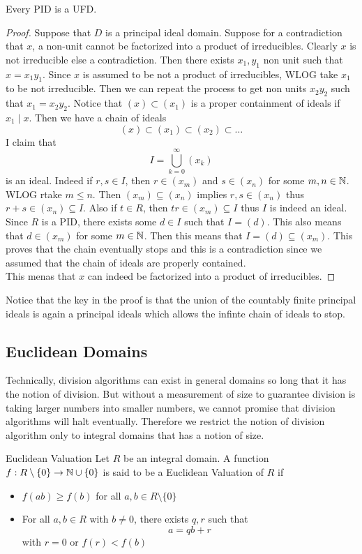 \documentclass[a4paper]{article}
\begin{document}
\begin{prp}{}{} Every PID is a UFD. 
\begin{proof}
Suppose that $D$ is a principal ideal domain. Suppose for a contradiction that $x$, a non-unit cannot be factorized into a product of irreducibles. Clearly $x$ is not irreducible else a contradiction. Then there exists $x_1,y_1$ non unit such that $x=x_1y_1$. Since $x$ is assumed to be not a product of irreducibles, WLOG take $x_1$ to be not irreducible. Then we can repeat the process to get non units $x_2y_2$ such that $x_1=x_2y_2$. Notice that $(x)\subset(x_1)$ is a proper containment of ideals if $x_1\;|\;x$. Then we have a chain of ideals $$(x)\subset(x_1)\subset(x_2)\subset\dots$$ I claim that $$I=\bigcup_{k=0}^\infty(x_k)$$ is an ideal. Indeed if $r,s\in I$, then $r\in(x_m)$ and $s\in(x_n)$ for some $m,n\in\mathbb{N}$. WLOG rtake $m\leq n$. Then $(x_m)\subseteq(x_n)$ implies $r,s\in(x_n)$ thus $r+s\in(x_n)\subseteq I$. Also if $t\in R$, then $tr\in(x_m)\subseteq I$ thus $I$ is indeed an ideal. \\
Since $R$ is a PID, there exists some $d\in I$ such that $I=(d)$. This also means that $d\in(x_m)$ for some $m\in\mathbb{N}$. Then this means that $I=(d)\subseteq(x_m)$. This proves that the chain eventually stops and this is a contradiction since we assumed that the chain of ideals are properly contained. \\
This menas that $x$ can indeed be factorized into a product of irreducibles. 
\end{proof}
\end{prp}

Notice that the key in the proof is that the union of the countably finite principal ideals is again a principal ideals which allows the infinte chain of ideals to stop. 

\subsection{Euclidean Domains}
Technically, division algorithms can exist in general domains so long that it has the notion of division. But without a measurement of size to guarantee division is taking larger numbers into smaller numbers, we cannot promise that division algorithms will halt eventually. Therefore we restrict the notion of division algorithm only to integral domains that has a notion of size. 

\begin{defn}{Euclidean Valuation}{} Let $R$ be an integral domain. A function $f:R\setminus\{0\}\to\mathbb{N}\cup\{0\}$ is said to be a Euclidean Valuation of $R$ if
\begin{itemize}
\item $f(ab)\geq f(b)$ for all $a,b\in R\setminus\{0\}$
\item For all $a,b\in R$ with $b\neq0$, there exists $q,r$ such that $$a=qb+r$$ with $r=0$ or $f(r)<f(b)$
\end{itemize}
\end{defn}
\end{document}
